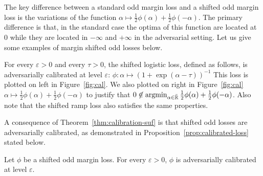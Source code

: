 The key difference between a standard odd margin loss and a shifted odd margin loss is the variations of the function $\alpha\mapsto\frac12\phi(\alpha)+\frac12\phi(-\alpha)$. 
The primary difference is that, in the standard case the optima of this function are located at $0$ while they are located in $-\infty$ and $+\infty$ in the adversarial setting. Let us give some examples of margin shifted odd losses below.

 
\begin{example*}
For every $\varepsilon>0$ and every $\tau>0$, the shifted logistic loss, defined as follows, is adversarially calibrated at level $\varepsilon$:
$\phi:\alpha\mapsto \left(1+\exp{\left(\alpha-\tau\right)}\right)^{-1}$
This loss is plotted on left in Figure~\ref{fig:cal}. We also plotted on right in Figure~\ref{fig:cal} $\alpha\mapsto\frac12\phi(\alpha)+\frac12\phi(-\alpha)$ to justify that $0\not\in\operatorname*{argmin}_{\alpha\in\bar{\mathbb{R}}}\frac12\phi(\alpha)+\frac12\phi(-\alpha)$. Also note that the shifted ramp loss also satisfies the same properties.
\end{example*}

A consequence of Theorem~\ref{thm:calibration-suf} is that shifted odd losses are adversarially calibrated, as demonstrated in Proposition~\ref{prop:calibrated-loss} stated below.

\begin{prop}
\label{prop:calibrated-loss}
Let $\phi$ be a shifted odd margin loss. For every $\varepsilon>0$, ${\phi}$ is adversarially calibrated at level $\varepsilon$.
\end{prop}


